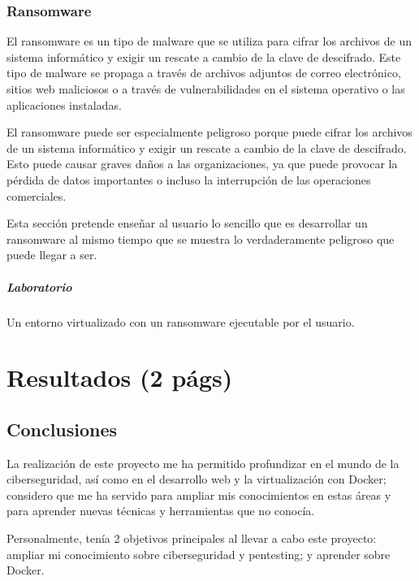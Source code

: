         \subsection{Ransomware}
        
            El ransomware es un tipo de malware que se utiliza para cifrar los archivos de un sistema informático y exigir un rescate a cambio de la clave de descifrado. Este tipo de malware se propaga a través de archivos adjuntos de correo electrónico, sitios web maliciosos o a través de vulnerabilidades en el sistema operativo o las aplicaciones instaladas.
            
            El ransomware puede ser especialmente peligroso porque puede cifrar los archivos de un sistema informático y exigir un rescate a cambio de la clave de descifrado. Esto puede causar graves daños a las organizaciones, ya que puede provocar la pérdida de datos importantes o incluso la interrupción de las operaciones comerciales.

            Esta sección pretende enseñar al usuario lo sencillo que es desarrollar un ransomware al mismo tiempo que se muestra lo verdaderamente peligroso que puede llegar a ser.
            
            \paragraph{Laboratorio}
            
                Un entorno virtualizado con un ransomware ejecutable por el usuario.
        
        \cleardoublepage



\chapter{Resultados (2 págs)}
    
    \section{Conclusiones}

        La realización de este proyecto me ha permitido profundizar en el mundo de la ciberseguridad, así como en el desarrollo web y la virtualización con Docker; considero que me ha servido para ampliar mis conocimientos en estas áreas y para aprender nuevas técnicas y herramientas que no conocía.
    
        Personalmente, tenía 2 objetivos principales al llevar a cabo este proyecto: ampliar mi conocimiento sobre ciberseguridad y pentesting; y aprender sobre Docker.

